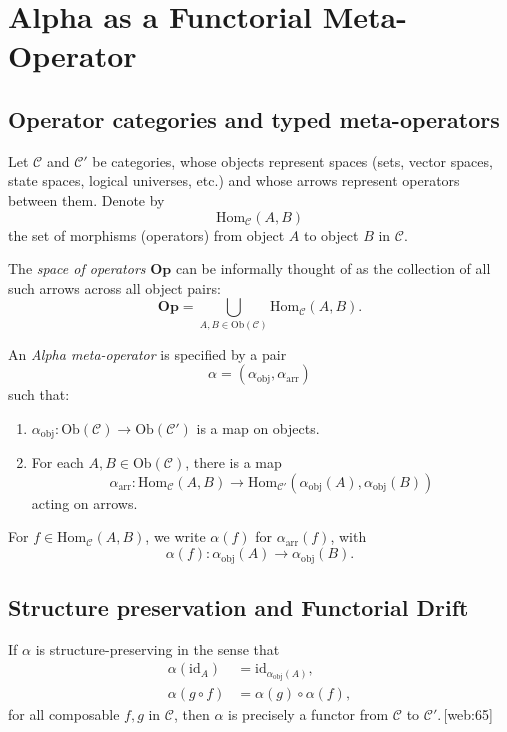 \documentclass[11pt]{article}
\begin{document}
\section{Alpha as a Functorial Meta-Operator}

\subsection{Operator categories and typed meta-operators}

Let \(\mathcal{C}\) and \(\mathcal{C}'\) be categories, whose objects represent spaces (sets, vector spaces, state spaces, logical universes, etc.) and whose arrows represent operators between them. Denote by
\[
\mathrm{Hom}_{\mathcal{C}}(A,B)
\]
the set of morphisms (operators) from object \(A\) to object \(B\) in \(\mathcal{C}\).

The \emph{space of operators} \(\mathbf{Op}\) can be informally thought of as the collection of all such arrows across all object pairs:
\[
\mathbf{Op} = \bigcup_{A,B \in \mathrm{Ob}(\mathcal{C})} \mathrm{Hom}_{\mathcal{C}}(A,B).
\]

\begin{definition}
An \emph{Alpha meta-operator} is specified by a pair
\[
\alpha = (\alpha_{\mathrm{obj}},\alpha_{\mathrm{arr}})
\]
such that:
\begin{enumerate}
  \item \(\alpha_{\mathrm{obj}} : \mathrm{Ob}(\mathcal{C}) \to \mathrm{Ob}(\mathcal{C}')\) is a map on objects.
  \item For each \(A,B \in \mathrm{Ob}(\mathcal{C})\), there is a map
  \[
    \alpha_{\mathrm{arr}} : \mathrm{Hom}_{\mathcal{C}}(A,B) \to \mathrm{Hom}_{\mathcal{C}'}(\alpha_{\mathrm{obj}}(A),\alpha_{\mathrm{obj}}(B))
  \]
  acting on arrows.
\end{enumerate}
For \(f \in \mathrm{Hom}_{\mathcal{C}}(A,B)\), we write \(\alpha(f)\) for \(\alpha_{\mathrm{arr}}(f)\), with
\[
\alpha(f) : \alpha_{\mathrm{obj}}(A) \to \alpha_{\mathrm{obj}}(B).
\]
\end{definition}

\subsection{Structure preservation and Functorial Drift}

If \(\alpha\) is structure-preserving in the sense that
\begin{align}
\alpha(\mathrm{id}_A) &= \mathrm{id}_{\alpha_{\mathrm{obj}}(A)}, \\
\alpha(g \circ f) &= \alpha(g) \circ \alpha(f),
\end{align}
for all composable \(f,g\) in \(\mathcal{C}\), then \(\alpha\) is precisely a functor from \(\mathcal{C}\) to \(\mathcal{C}'\).\,[web:65]
\end{document}
